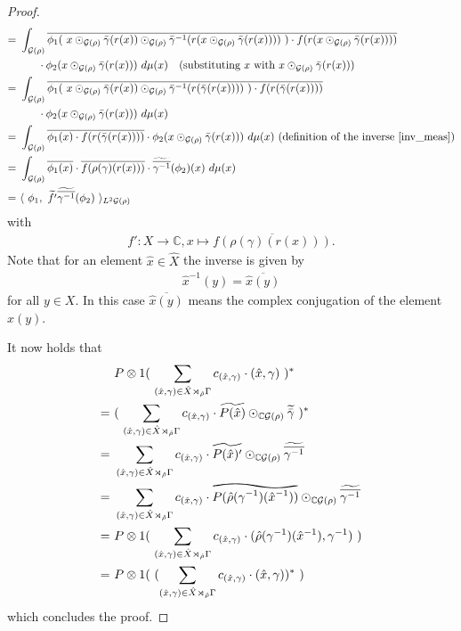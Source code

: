 \documentclass[12pt,a4paper]{scrartcl}
\theoremstyle{plain}
\theoremstyle{definition}
\newcommand{\C}{\mathbb{C}} %
\newcommand{\2}{\mathbb{Z} / 2 \mathbb{Z}}
\newcommand{\G}{\mathcal{G}}
\newcommand{\1}{\bar{1}}
\newcommand{\0}{\bar{0}}
\newcommand{\reallywidetilde}[1]{\ThisStyle{%
		\setbox0=\hbox{$\SavedStyle#1$}%
		\stackengine{-.1\LMpt}{$\SavedStyle#1$}{%
			\stretchto{\scaleto{\SavedStyle\mkern.2mu\AC}{.5150\wd0}}{.6\ht0}%
		}{O}{c}{F}{T}{S}%
}}
\begin{document}
\begin{proof}
\begin{align*}
		=&~ \int_{\G (\rho)} \overline{\phi_1(~x \odot_{\G (\rho)} \bar{\gamma}(r(x)) \odot_{\G (\rho)} \bar{\gamma}^{-1}(r(x \odot_{\G (\rho)} \bar{\gamma}(r(x))))~) \cdot f(r(x \odot_{\G (\rho)} \bar{\gamma}(r(x))))} \\
		&~~~~~~\cdot \phi_2 (x \odot_{\G (\rho)} \bar{\gamma}(r(x))) ~ d \mu (x) ~~~ \text{(substituting $x$ with $x \odot_{\G (\rho)} \bar{\gamma}(r(x))$)}\\
		=&~ \int_{\G (\rho)} \overline{\phi_1(~x \odot_{\G (\rho)} \bar{\gamma}(r(x)) \odot_{\G (\rho)} \bar{\gamma}^{-1}(r( \bar{\gamma}(r(x))))~) \cdot f(r(\bar{\gamma}(r(x))))} \\
		&~~~~~~\cdot \phi_2 (x \odot_{\G (\rho)} \bar{\gamma}(r(x))) ~ d \mu (x) \\
		=&~ \int_{\G (\rho)} \overline{\phi_1(x) \cdot f(r(\bar{\gamma}(r(x))))} \cdot \phi_2 (x \odot_{\G (\rho)} \bar{\gamma}(r(x))) ~ d \mu (x) ~ \text{(definition of the inverse \ref{inv_meas})} \\
		=&~ \int_{\G (\rho)} \overline{\phi_1(x)} \cdot \overline{f(\rho(\gamma)(r(x)))} \cdot \widetilde{\overline{\gamma^{-1}}}(\phi_2)(x) ~ d \mu (x) \\
		=&~ \langle ~\phi_1,~ \widetilde{f'} \widetilde{\overline{\gamma^{-1}}}  (\phi_2) ~\rangle_{L^2 \G(\rho)}
	\end{align*}
	with
	\begin{align*}
		f' \colon X \to \C, x \mapsto \overline{f(\rho(\gamma)(r(x)))}.
	\end{align*}
	Note that for an element $\hat{x} \in \hat{X}$ the inverse is given by 
	\begin{align*}
		\hat{x}^{-1}(y) = \overline{\hat{x}(y)}
	\end{align*}
	for all $y \in X$. In this case $\overline{\hat{x}(y)}$ means the complex conjugation of the element $\hat{x}(y)$.
	
	It now holds that
	\begin{align*}
		 &~ P \otimes 1 (~\sum_{(\hat{x}, \gamma) \in \hat{X} \rtimes_{\hat{\rho}} \Gamma} c_{(\hat{x}, \gamma)} \cdot (\hat{x}, \gamma)~)^{*} \\
		=&~ (~\sum_{(\hat{x}, \gamma) \in \hat{X} \rtimes_{\hat{\rho}} \Gamma} c_{(\hat{x}, \gamma)} \cdot \widetilde{P(\hat{x})} \odot_{\C\G(\rho)} \widetilde{\bar{\gamma}}~)^{*} \\
		=&~ \sum_{(\hat{x}, \gamma) \in \hat{X} \rtimes_{\hat{\rho}} \Gamma} c_{(\hat{x}, \gamma)} \cdot \widetilde{P(\hat{x})'} \odot_{\C\G(\rho)} \widetilde{\overline{\gamma^{-1}}} \\
		=&~ \sum_{(\hat{x}, \gamma) \in \hat{X} \rtimes_{\hat{\rho}} \Gamma} c_{(\hat{x}, \gamma)} \cdot \reallywidetilde{P(\hat{\rho}(\gamma^{-1})(\hat{x}^{-1}))} \odot_{\C\G(\rho)} \widetilde{\overline{\gamma^{-1}}} \\
		=&~ P \otimes 1 (~ \sum_{(\hat{x}, \gamma) \in \hat{X} \rtimes_{\hat{\rho}} \Gamma} c_{(\hat{x}, \gamma)} \cdot (\hat{\rho}(\gamma^{-1})(\hat{x}^{-1}), \gamma^{-1}) ~) \\
		=&~ P \otimes 1 (~(\sum_{(\hat{x}, \gamma) \in \hat{X} \rtimes_{\hat{\rho}} \Gamma} c_{(\hat{x}, \gamma)} \cdot (\hat{x}, \gamma))^{*}~)
	\end{align*}
	which concludes the proof.
\end{proof}
\end{document}
